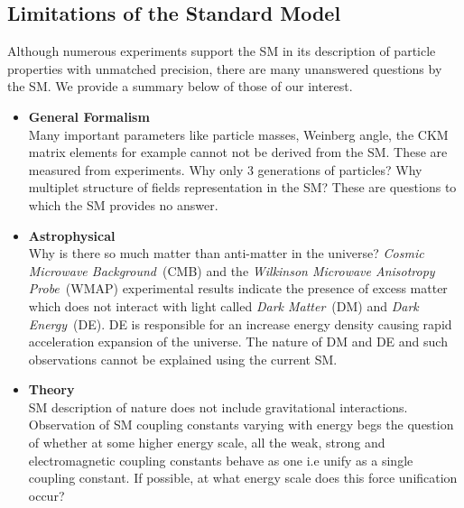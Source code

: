 \subsection{Limitations of the Standard Model }
Although numerous experiments support the SM in its description of particle properties with unmatched precision, there are many unanswered questions by the SM. We provide a summary below of those of our interest.
\begin{itemize}
\item \textbf{General Formalism} \mbox{}\\ Many important parameters like particle masses, Weinberg angle, the CKM matrix elements for example cannot not be derived from the SM. These are measured from experiments. Why only 3 generations of particles? 
Why multiplet structure of fields representation in the SM? These are questions to which the SM provides no answer.

\item \textbf{Astrophysical} \mbox{}\\
Why is there so much matter than anti-matter in the universe? \textit{Cosmic Microwave Background}~(CMB) and the \textit{Wilkinson Microwave Anisotropy Probe}~(WMAP) experimental results indicate the presence of excess matter which does not interact with light called \textit{Dark Matter}~(DM) and \textit{Dark Energy}~(DE). DE is responsible for an increase energy density causing rapid acceleration expansion of the universe. The nature of DM and DE and such observations cannot be explained using the current SM.
\item \textbf{Theory} \mbox{}\\
SM description of nature does not include gravitational interactions.
Observation of SM coupling constants varying with energy begs the question of whether at some higher energy scale, all the weak, strong and electromagnetic coupling constants behave as one i.e unify as a single coupling constant. If possible, at what energy scale does this force unification occur?


\end{itemize}
